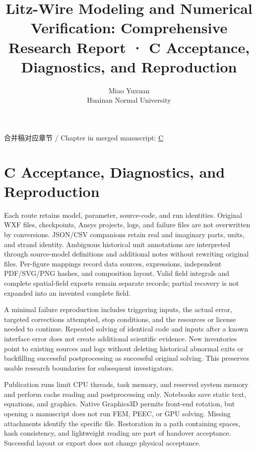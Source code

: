 \documentclass[11pt]{article}
\begin{document}
\title{Litz-Wire Modeling and Numerical Verification: Comprehensive Research Report · C Acceptance, Diagnostics, and Reproduction}
\author{Miao Yuxuan\\Huainan Normal University}
\date{}
\maketitle
\noindent 合并稿对应章节 / Chapter in merged manuscript: \href{report_en_single.pdf#chapter-C}{C}\par
\FloatBarrier
\section*{C Acceptance, Diagnostics, and Reproduction}
\hypertarget{chapter-C}{}
Each route retains model, parameter, source-code, and run identities. Original WXF files, checkpoints, Ansys projects, logs, and failure files are not overwritten by conversions. JSON/CSV companions retain real and imaginary parts, units, and strand identity. Ambiguous historical unit annotations are interpreted through source-model definitions and additional notes without rewriting original files. Per-figure mappings record data sources, expressions, independent PDF/SVG/PNG hashes, and composition layout. Valid field integrals and complete spatial-field exports remain separate records; partial recovery is not expanded into an invented complete field.


A minimal failure reproduction includes triggering inputs, the actual error, targeted corrections attempted, stop conditions, and the resources or license needed to continue. Repeated solving of identical code and inputs after a known interface error does not create additional scientific evidence. New inventories point to existing sources and logs without deleting historical abnormal exits or backfilling successful postprocessing as successful original solving. This preserves usable research boundaries for subsequent investigators.


Publication runs limit CPU threads, task memory, and reserved system memory and perform cache reading and postprocessing only. Notebooks save static text, equations, and graphics. Native Graphics3D permits front-end rotation, but opening a manuscript does not run FEM, PEEC, or GPU solving. Missing attachments identify the specific file. Restoration in a path containing spaces, hash consistency, and lightweight reading are part of handover acceptance. Successful layout or export does not change physical acceptance.
\end{document}
